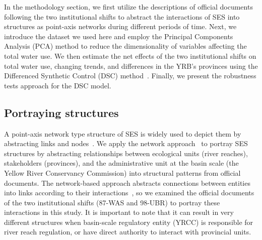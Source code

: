 
In the methodology section, we first utilize the descriptions of official documents following the two institutional shifts to abstract the interactions of SES into structures as point-axis networks during different periods of time.
Next, we introduce the dataset we used here and employ the Principal Components Analysis (PCA) method to reduce the dimensionality of variables affecting the total water use.
We then estimate the net effects of the two institutional shifts on total water use, changing trends, and differences in the YRB's provinces using the Differenced Synthetic Control (DSC) method~\cite{arkhangelsky2021}.
Finally, we present the robustness tests approach for the DSC model.

\subsection{Portraying structures}\label{sec:structures}
A point-axis network type structure of SES is widely used to depict them by abstracting links and nodes~\cite{wang2022g,bodin2017a,kluger2020,guerrero2015}.
We apply the network approach~\cite{bodin2017b} to portray SES structures by abstracting relationships between ecological units (river reaches), stakeholders (provinces), and the administrative unit at the basin scale (the Yellow River Conservancy Commission) into structural patterns from official documents.
The network-based approach abstracts connections between entities into links according to their interactions~\cite{bodin2017a,kluger2020,guerrero2015}, so we examined the official documents of the two institutional shifts (87-WAS and 98-UBR) to portray these interactions in this study.
It is important to note that it can result in very different structures when basin-scale regulatory entity (YRCC) is responsible for river reach regulation, or have direct authority to interact with provincial units.

